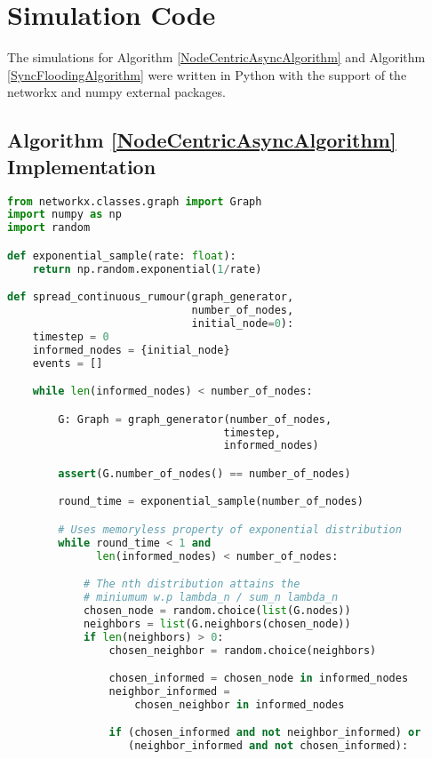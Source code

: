 \chapter{Simulation Code}

The simulations for Algorithm \ref{NodeCentricAsyncAlgorithm} and Algorithm \ref{SyncFloodingAlgorithm} were written in Python with the support of the networkx \cite{networkx} and numpy \cite{numpy} external packages.

\section{Algorithm \ref{NodeCentricAsyncAlgorithm} Implementation}

\begin{lstlisting}[language=Python]
from networkx.classes.graph import Graph
import numpy as np
import random

def exponential_sample(rate: float):
    return np.random.exponential(1/rate)

def spread_continuous_rumour(graph_generator,
                             number_of_nodes, 
                             initial_node=0):
    timestep = 0
    informed_nodes = {initial_node}
    events = []

    while len(informed_nodes) < number_of_nodes:

        G: Graph = graph_generator(number_of_nodes, 
                                  timestep, 
                                  informed_nodes)

        assert(G.number_of_nodes() == number_of_nodes)

        round_time = exponential_sample(number_of_nodes)

        # Uses memoryless property of exponential distribution
        while round_time < 1 and 
              len(informed_nodes) < number_of_nodes:

            # The nth distribution attains the 
            # miniumum w.p lambda_n / sum_n lambda_n
            chosen_node = random.choice(list(G.nodes))
            neighbors = list(G.neighbors(chosen_node))
            if len(neighbors) > 0:
                chosen_neighbor = random.choice(neighbors)

                chosen_informed = chosen_node in informed_nodes
                neighbor_informed = 
                    chosen_neighbor in informed_nodes

                if (chosen_informed and not neighbor_informed) or 
                   (neighbor_informed and not chosen_informed):


\end{lstlisting}
